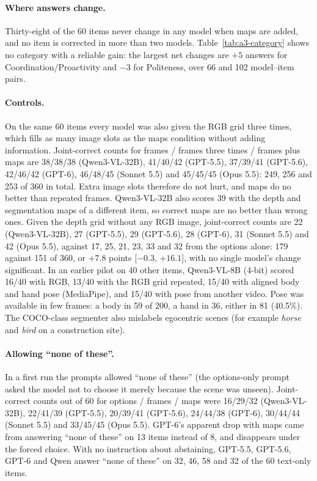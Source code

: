 \paragraph{Where answers change.} Thirty-eight of the 60 items never change in any model when maps are added, and no item is corrected in more than two models. Table~\ref{tab:a3-category} shows no category with a reliable gain: the largest net changes are $+5$ answers for Coordination/Proactivity and $-3$ for Politeness, over 66 and 102 model--item pairs.

\paragraph{Controls.} On the same 60 items every model was also given the RGB grid three times, which fills as many image slots as the maps condition without adding information. Joint-correct counts for frames / frames three times / frames plus maps are 38/38/38 (Qwen3-VL-32B), 41/40/42 (GPT-5.5), 37/39/41 (GPT-5.6), 42/46/42 (GPT-6), 46/48/45 (Sonnet 5.5) and 45/45/45 (Opus 5.5): 249, 256 and 253 of 360 in total. Extra image slots therefore do not hurt, and maps do no better than repeated frames. Qwen3-VL-32B also scores 39 with the depth and segmentation maps of a different item, so correct maps are no better than wrong ones. Given the depth grid without any RGB image, joint-correct counts are 22 (Qwen3-VL-32B), 27 (GPT-5.5), 29 (GPT-5.6), 28 (GPT-6), 31 (Sonnet 5.5) and 42 (Opus 5.5), against 17, 25, 21, 23, 33 and 32 from the options alone: 179 against 151 of 360, or $+7.8$ points [$-0.3$, $+16.1$], with no single model's change significant. In an earlier pilot on 40 other items, Qwen3-VL-8B (4-bit) scored 16/40 with RGB, 13/40 with the RGB grid repeated, 15/40 with aligned body and hand pose (MediaPipe), and 15/40 with pose from another video. Pose was available in few frames: a body in 59 of 200, a hand in 36, either in 81 (40.5\%). The COCO-class segmenter also mislabels egocentric scenes (for example \emph{horse} and \emph{bird} on a construction site).

\paragraph{Allowing ``none of these''.} In a first run the prompts allowed ``none of these'' (the options-only prompt asked the model not to choose it merely because the scene was unseen). Joint-correct counts out of 60 for options / frames / maps were 16/29/32 (Qwen3-VL-32B), 22/41/39 (GPT-5.5), 20/39/41 (GPT-5.6), 24/44/38 (GPT-6), 30/44/44 (Sonnet 5.5) and 33/45/45 (Opus 5.5). GPT-6's apparent drop with maps came from answering ``none of these'' on 13 items instead of 8, and disappears under the forced choice. With no instruction about abstaining, GPT-5.5, GPT-5.6, GPT-6 and Qwen answer ``none of these'' on 32, 46, 58 and 32 of the 60 text-only items.

